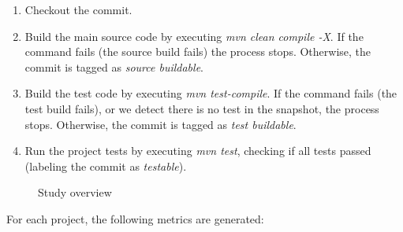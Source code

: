\begin{enumerate}
    \item Checkout the commit.
    \item Build the main source code by executing \textit{mvn clean compile -X}. If the command fails (the source build fails) the process stops. Otherwise, the commit is tagged as \textit{source buildable}.
    \item Build the test code by executing \textit{mvn test-compile}. If the command fails (the test build fails), or we detect there is no test in the snapshot, the process stops. Otherwise, the commit is tagged as \textit{test buildable}.
    \item Run the project tests by executing \textit{mvn test}, checking if all tests passed (labeling the commit as \textit{testable}).
\end{enumerate}


\begin{figure}[h!]
    \centering    
    
    \caption{Study overview}
    \label{fig:methodology-process}
\end{figure}


For each project, the following metrics are generated:

